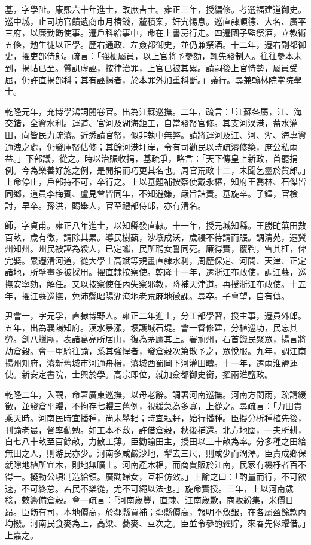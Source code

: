 \begin{pinyinscope}
基，字學阯。康熙六十年進士，改庶吉士。雍正三年，授編修。考選福建道御史。巡中城，止司坊官饋遺商巿月椿錢，釐積案，奸宄惕息。巡直隸順德、大名、廣平三府，以廉勤飭使事。遷戶科給事中，命在上書房行走。四遷國子監祭酒，立教術五條，勉生徒以正學。歷右通政、左僉都御史，並仍兼祭酒。十二年，遷右副都御史，擢吏部侍郎。疏言：「強梗屬員，以上官將予參劾，輒先發制人。往往參本未到，揭帖已至。質訊虛誣，按律治罪，上官已被其累。請嗣後上官恃勢，屬員受屈，仍許直揭部科；其有誣揭者，於本罪外加重科斷。」議行。尋兼翰林院掌院學士。

乾隆元年，充博學鴻詞閱卷官。出為江蘇巡撫。二年，疏言：「江蘇各屬，江、海交錯，全資水利。運道、官河及湖海鉅工，自當發帑官修。其支河汊港，蓄水灌田，向皆民力疏濬。近悉請官帑，似非執中無弊。請將運河及江、河、湖、海專資通洩之處，仍發庫帑估修；其餘河港圩岸，令有司勸民以時疏濬修築，庶公私兩益。」下部議，從之。時以治賑收捐，基疏爭，略言：「天下傳皇上新政，首罷捐例。今為樂善好施之例，是開捐而巧更其名也。周官荒政十二，未聞乞靈於貲郎。」上命停止，戶部持不可，卒行之。上以基題補按察使戴永椿，知府王喬林、石傑皆同鄉，道員李梅賓、盧見曾皆同年，不知避嫌，嚴旨詰責。基旋卒。子鐸，官檢討，早卒。孫洪，賜舉人，官至禮部侍郎，亦有清名。

師，字貞甫。雍正八年進士，以知縣發直隸。十一年，授元城知縣。王勝甿蕪田數百畝，歲有徵，請除其累。導民樹蓺，沙壤成沃，歲祲不待請而賑。調清苑，遷冀州知州。州民被誣為殺人，已定讞，民所聘女誓同死。廉得實，覆鞫，雪其枉，俾完娶。累遷清河道，從大學士高斌等規畫直隸水利，周歷保定、河間、天津、正定諸地，所擘畫多被採用。擢直隸按察使。乾隆十一年，遷浙江布政使，調江蘇，巡撫安寧劾，解任。又以按察使任內失察邪教，降補天津道。再授浙江布政使。十五年，擢江蘇巡撫，免沛縣昭陽湖淹地老荒麻地徵課。尋卒。子亶望，自有傳。

尹會一，字元孚，直隸博野人。雍正二年進士，分工部學習，授主事，遷員外郎。五年，出為襄陽知府。漢水暴漲，壞護城石堤。會一督修建，分植巡功，民忘其勞。創八蠟廟，表諸葛亮所居山，復為茅廬其上。署荊州，石首饑民聚眾，揚言將劫倉穀。會一單騎往諭，系其強悍者，發倉穀次第散予之，眾悅服。九年，調江南揚州知府，濬新舊城巿河通舟楫，濬城西蜀岡下河灌田疇。十一年，遷兩淮鹽運使。新安定書院，士興於學。高宗即位，就加僉都御史銜，擢兩淮鹽政。

乾隆二年，入覲，命署廣東巡撫，以母老辭。調署河南巡撫。河南方閔雨，疏請緩徵，並發倉平糶，不拘存七糶三舊例，視緩急為多寡，上從之。尋疏言：「力田貴乘天時。河南民時宜播種，尚未舉耜；時宜耘耔，始行播種。臣擬分析種植先後，刊諭老農，督率勸勉。如工本不敷，許借倉穀，秋後補還。北方地闊，一夫所耕，自七八十畝至百餘畝，力散工薄。臣勸諭田主，授田以三十畝為率。分多種之田給無田之人，則游民亦少。河南多咸鹼沙地，犁去三尺，則咸少而潤澤。臣責成鄉保就隙地植所宜木，則地無曠土。河南產木棉，而商賈販於江南，民家有機杼者百不得一。擬動公項制造給領。廣勸婦女，互相仿效。」上諭之曰：「酌量而行，不可欲速，不可終怠。若民不樂從，尤不可繩以法也。」旋命實授。三年，上以河南歲稔，敕籌備倉穀。會一疏言：「河南歲豐，直隸、江南歲歉，商販紛集，米價日昂。臣飭有司，本地價高，於鄰縣買補；鄰縣價高，報明不敷銀，在各屬盈餘款內均撥。河南民食麥為上，高粱、蕎麥、豆次之。臣並令參酌糴貯，來春先侭糶借。」上嘉之。


\end{pinyinscope}

